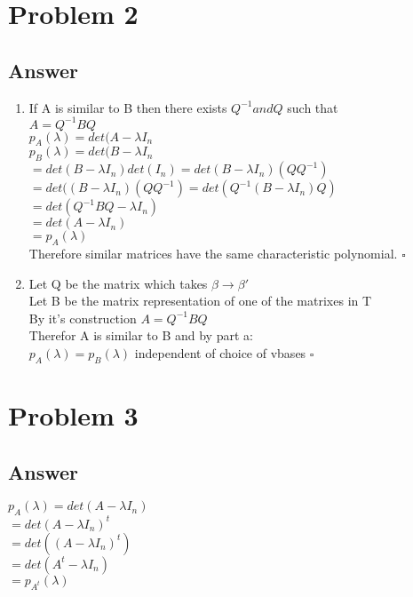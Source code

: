 \documentclass{article}
\begin{document}
\section*{Problem 2}
\subsection*{Answer}
\begin{enumerate}[label=(\alph{*})]
  \item
    If A is similar to B then there exists \(Q^{-1} and Q\) such that\\
    \(A = Q^{-1}BQ\) \\
    \(p_{A}(\lambda) = det(A - \lambda I_{n}\) \\
    \(p_{B}(\lambda) = det(B - \lambda I_{n}\) \\
    \( = det(B - \lambda I_{n})\)\(det(I_{n}) = det(B - \lambda I_{n})(QQ^{-1})\) \\
    \( = det((B - \lambda I_{n})(QQ^{-1}) = det(Q^{-1}(B-\lambda I_{n})Q)\) \\
    \( = det(Q^{-1}BQ - \lambda I_{n})\) \\
    \( = det(A - \lambda I_{n})\) \\
    \( = p_{A}(\lambda) \) \\
    Therefore similar matrices have the same characteristic polynomial. \(\square\)
  \item
    Let Q be the matrix which takes \(\beta \to \beta'\) \\
    Let B be the matrix representation of one of the matrixes in T\\
    By it's construction \(A = Q^{-1}BQ\) \\
    Therefor A is similar to B and by part a: \\
    \(p_{A}(\lambda) = p_{B}(\lambda)\) independent  of choice of vbases \(\square\)
\end{enumerate}
\section*{Problem 3}
\subsection*{Answer}
  \(p_{A}(\lambda) = det(A - \lambda I_{n})\)\\
  \( = det(A - \lambda I_{n})^{t}\)\\
  \( = det((A - \lambda I_{n})^{t})\)\\
  \( = det(A^{t} - \lambda I_{n})\) \\
  \( = p_{A^{t}}(\lambda)\)
\end{document}
